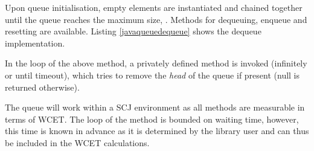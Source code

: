 

Upon queue initialisation, empty elements are instantiated and chained together until the queue reaches the maximum size, . Methods for dequeuing, enqueue and resetting are available. Listing \ref{javaqueuedequeue} shows the dequeue implementation.



In the loop of the above method, a privately defined  method is invoked (infinitely or until timeout), which tries to remove the \textit{head} of the queue if present (null is returned otherwise).

The queue will work within a SCJ environment as all methods are measurable in terms of WCET. The loop of the  method is bounded on waiting time, however, this time is known in advance as it is determined by the library user and can thus be included in the WCET calculations.